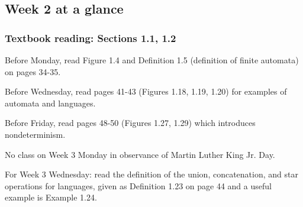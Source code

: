 

\subsection*{Week 2 at a glance}

\vspace{-15pt}

\subsubsection*{Textbook reading: Sections 1.1, 1.2}

\vspace{-15pt}

Before Monday, read Figure 1.4 and Definition 1.5 (definition of finite automata) on pages 34-35.

Before Wednesday, read pages 41-43 (Figures 1.18, 1.19, 1.20) for examples of automata and languages.

Before Friday, read pages 48-50 (Figures 1.27, 1.29) which introduces nondeterminism.

No class on Week 3 Monday in observance of Martin Luther King Jr. Day.

For Week 3 Wednesday: read the definition of the union, concatenation, and star operations for languages,  given 
as Definition 1.23 on page 44 and a useful example is Example 1.24.

\vspace{-20pt}

